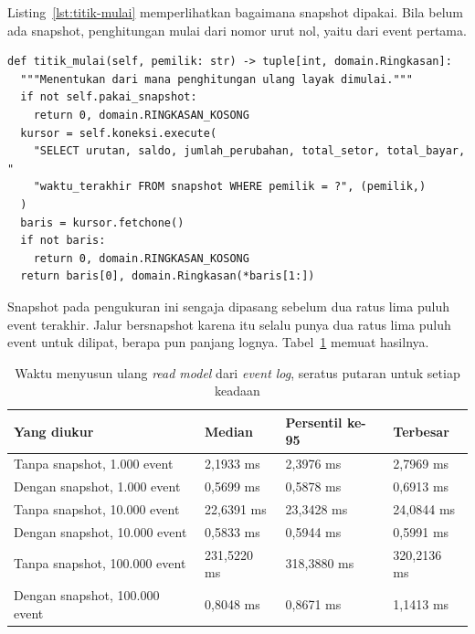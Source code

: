 Listing~\ref{lst:titik-mulai} memperlihatkan bagaimana snapshot dipakai. Bila
belum ada snapshot, penghitungan mulai dari nomor urut nol, yaitu dari
event pertama.

\begin{lstlisting}[style=PythonStyle, caption={Snapshot menentukan dari mana
  lipatan dimulai, tersedia di \berkas{sources/chapter10/versi_event.py}},
  label=lst:titik-mulai]
def titik_mulai(self, pemilik: str) -> tuple[int, domain.Ringkasan]:
  """Menentukan dari mana penghitungan ulang layak dimulai."""
  if not self.pakai_snapshot:
    return 0, domain.RINGKASAN_KOSONG
  kursor = self.koneksi.execute(
    "SELECT urutan, saldo, jumlah_perubahan, total_setor, total_bayar, "
    "waktu_terakhir FROM snapshot WHERE pemilik = ?", (pemilik,)
  )
  baris = kursor.fetchone()
  if not baris:
    return 0, domain.RINGKASAN_KOSONG
  return baris[0], domain.Ringkasan(*baris[1:])
\end{lstlisting}

Snapshot pada pengukuran ini sengaja dipasang sebelum dua ratus lima puluh
event terakhir. Jalur bersnapshot karena itu selalu punya dua ratus lima
puluh event untuk dilipat, berapa pun panjang lognya.
Tabel~\ref{tab:penghitungan-ulang} memuat hasilnya.

\begin{table}[htbp]
  \centering
  \caption{Waktu menyusun ulang \textit{read model} dari \textit{event log}, seratus putaran
    untuk setiap keadaan}
  \label{tab:penghitungan-ulang}
  \begin{tabularx}{\textwidth}{|X|l|l|l|}
    \hline
    \textbf{Yang diukur} & \textbf{Median} & \textbf{Persentil ke-95} & \textbf{Terbesar} \\
    \hline
    Tanpa snapshot, 1.000 event & 2,1933 ms & 2,3976 ms & 2,7969 ms \\
    \hline
    Dengan snapshot, 1.000 event & 0,5699 ms & 0,5878 ms & 0,6913 ms \\
    \hline
    Tanpa snapshot, 10.000 event & 22,6391 ms & 23,3428 ms & 24,0844 ms \\
    \hline
    Dengan snapshot, 10.000 event & 0,5833 ms & 0,5944 ms & 0,5991 ms \\
    \hline
    Tanpa snapshot, 100.000 event & 231,5220 ms & 318,3880 ms & 320,2136 ms \\
    \hline
    Dengan snapshot, 100.000 event & 0,8048 ms & 0,8671 ms & 1,1413 ms \\
    \hline
  \end{tabularx}
\end{table}

